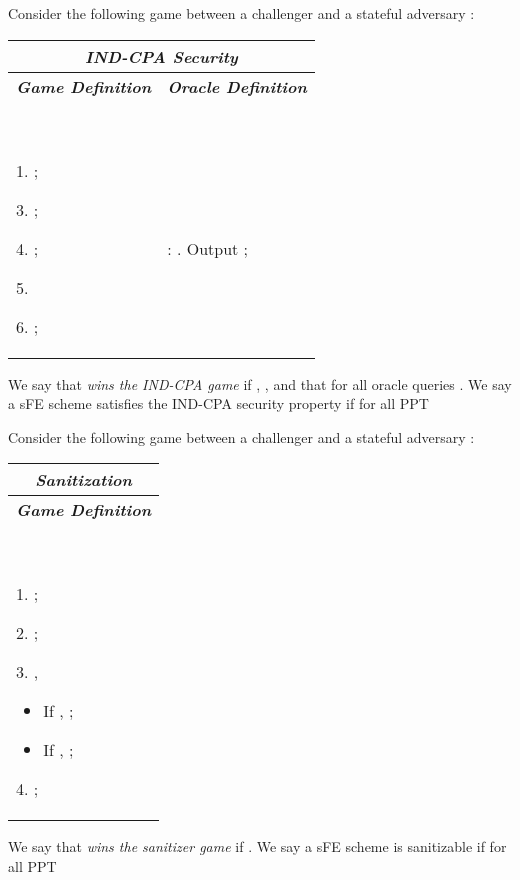\documentclass{llncs}
\begin{document}
\begin{defi} \label{def:FEnoread}
Consider the following game between a challenger  and a stateful adversary :
\begin{center}
\begin{small}
    \begin{tabular}{| p{5.5cm} | p{5cm} |}
    \hline
	\multicolumn{2}{|c|}{\textbf{\emph{ IND-CPA Security}}} \\
	\hline
	\multicolumn{1}{|c|}{\textbf{\emph{Game Definition}}} & \multicolumn{1}{|c|}{\textbf{\emph{Oracle Definition}}}  \\
	\hline
	\
	
	1. ;

	3. ;
	
	4. ;

	5. 
	
	6. ;

	&
	\

	: \newline 1. Output ;

	\\
	\hline
	\end{tabular}
\end{small}
\end{center}
We say that  \emph{wins the IND-CPA game} if , , and that  for all oracle queries .
We say a sFE scheme satisfies the IND-CPA security property if for all PPT 
 
\end{defi}

\begin{defi} \label{def:FEnowrite}
Consider the following game between a challenger  and a stateful adversary :
\begin{center}
\begin{small}
    \begin{tabular}{| p{8cm} |}
    \hline
	\multicolumn{1}{|c|}{\textbf{\emph{Sanitization}}} \\
	\hline
	\multicolumn{1}{|c|}{\textbf{\emph{Game Definition}}}  \\
	\hline
	\

	1. ;

	2. ;

	3. , 
	\begin{itemize}
		\item If , ;
		\item If , ; 
	\end{itemize}
	4. ;

	\\
	\hline
	\end{tabular}
\end{small}
\end{center}
We say that  \emph{wins the sanitizer game} if .
We say a sFE scheme is sanitizable if for all PPT 
 
\end{defi}
\end{document}
